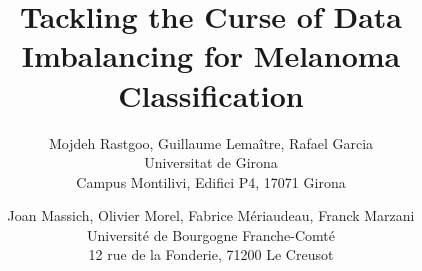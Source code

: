 \title{Tackling the Curse of Data Imbalancing for Melanoma Classification}

\author{Mojdeh Rastgoo, Guillaume Lema\^itre, Rafael Garcia\\
Universitat de Girona\\
Campus Montilivi, Edifici P4, 17071 Girona\\
\and
Joan Massich, Olivier Morel, Fabrice M\'eriaudeau, Franck Marzani\\
Universit\'e de Bourgogne Franche-Comt\'e\\
12 rue de la Fonderie, 71200 Le Creusot\\
}
